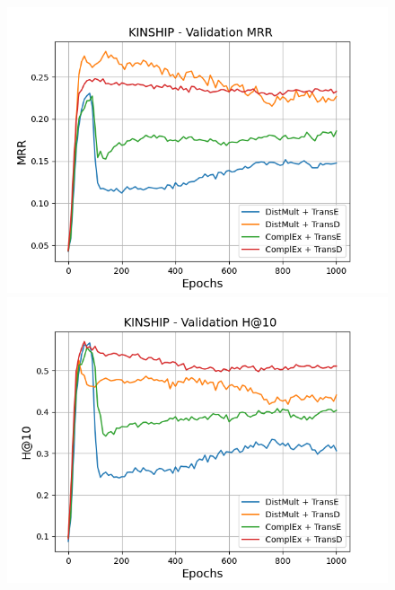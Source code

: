 \begin{figure}[H]
    \centering
    \begin{minipage}{.45\textwidth}
      \centering
      \includegraphics[width=0.9\linewidth]{figures/results/gan_train/not_pretrained/uncertainty/max/entropy/kinship/1k_epochs/uncertainty_kinship_mrrs.png}
    \end{minipage}%
    \begin{minipage}{.45\textwidth}
      \centering
      \includegraphics[width=0.9\linewidth]{figures/results/gan_train/not_pretrained/uncertainty/max/entropy/kinship/1k_epochs/uncertainty_kinship_hit10.png}
    \end{minipage}
    

\end{figure}
